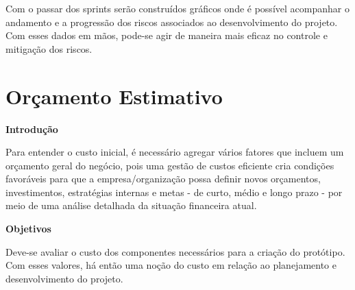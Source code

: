 Com o passar dos sprints serão construídos gráficos onde é possível acompanhar o andamento e a progressão dos riscos associados ao desenvolvimento do projeto. Com esses dados em mãos, pode-se agir de maneira mais eficaz no controle e mitigação dos riscos.
\section{Orçamento Estimativo}
\label{orçamento}
\textbf{Introdução}

Para entender o custo inicial, é necessário agregar vários fatores que incluem um orçamento geral do negócio, pois uma gestão de custos eficiente cria condições favoráveis para que a empresa/organização possa definir novos orçamentos, investimentos, estratégias internas e metas - de curto, médio e longo prazo - por meio de uma análise detalhada da situação financeira atual.

\textbf {Objetivos}

Deve-se avaliar o custo dos componentes necessários para a criação do protótipo. Com esses valores, há então uma noção do custo em relação ao planejamento e desenvolvimento do projeto.

